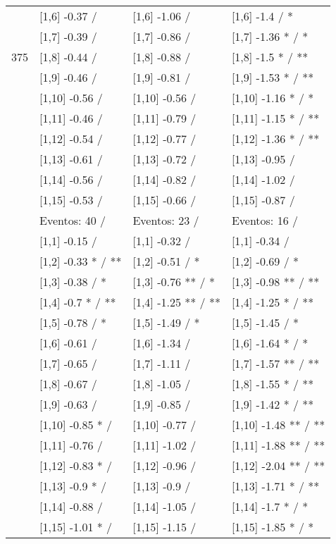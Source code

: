 \begin{table}
\begin{tabular}[t]{llll}
 & {}[1,6] -0.37  / & {}[1,6] -1.06  / & {}[1,6] -1.4  / *\\
 & {}[1,7] -0.39  / & {}[1,7] -0.86  / & {}[1,7] -1.36 * / *\\
375 & {}[1,8] -0.44  / & {}[1,8] -0.88  / & {}[1,8] -1.5 * / **\\
\addlinespace
 & {}[1,9] -0.46  / & {}[1,9] -0.81  / & {}[1,9] -1.53 * / **\\
 & {}[1,10] -0.56  / & {}[1,10] -0.56  / & {}[1,10] -1.16 * / *\\
 & {}[1,11] -0.46  / & {}[1,11] -0.79  / & {}[1,11] -1.15 * / **\\
 & {}[1,12] -0.54  / & {}[1,12] -0.77  / & {}[1,12] -1.36 * / **\\
 & {}[1,13] -0.61  / & {}[1,13] -0.72  / & {}[1,13] -0.95  /\\
\addlinespace
 & {}[1,14] -0.56  / & {}[1,14] -0.82  / & {}[1,14] -1.02  /\\
 & {}[1,15] -0.53  / & {}[1,15] -0.66  / & {}[1,15] -0.87  /\\
 & Eventos:  40 / & Eventos:  23 / & Eventos:  16 /\\
 & {}[1,1] -0.15  / & {}[1,1] -0.32  / & {}[1,1] -0.34  /\\
 & {}[1,2] -0.33 * / ** & {}[1,2] -0.51  / * & {}[1,2] -0.69  / *\\
\addlinespace
 & {}[1,3] -0.38  / * & {}[1,3] -0.76 ** / * & {}[1,3] -0.98 ** / **\\
 & {}[1,4] -0.7 * / ** & {}[1,4] -1.25 ** / ** & {}[1,4] -1.25 * / **\\
 & {}[1,5] -0.78  / * & {}[1,5] -1.49  / * & {}[1,5] -1.45  / *\\
 & {}[1,6] -0.61  / & {}[1,6] -1.34  / & {}[1,6] -1.64 * / *\\
 & {}[1,7] -0.65  / & {}[1,7] -1.11  / & {}[1,7] -1.57 ** / **\\
\addlinespace
500 & {}[1,8] -0.67  / & {}[1,8] -1.05  / & {}[1,8] -1.55 * / **\\
 & {}[1,9] -0.63  / & {}[1,9] -0.85  / & {}[1,9] -1.42 * / **\\
 & {}[1,10] -0.85 * / & {}[1,10] -0.77  / & {}[1,10] -1.48 ** / **\\
 & {}[1,11] -0.76  / & {}[1,11] -1.02  / & {}[1,11] -1.88 ** / **\\
 & {}[1,12] -0.83 * / & {}[1,12] -0.96  / & {}[1,12] -2.04 ** / **\\
\addlinespace
 & {}[1,13] -0.9 * / & {}[1,13] -0.9  / & {}[1,13] -1.71 * / **\\
 & {}[1,14] -0.88  / & {}[1,14] -1.05  / & {}[1,14] -1.7 * / *\\
 & {}[1,15] -1.01 * / & {}[1,15] -1.15  / & {}[1,15] -1.85 * / *\\
\bottomrule
\end{tabular}
\end{table}
